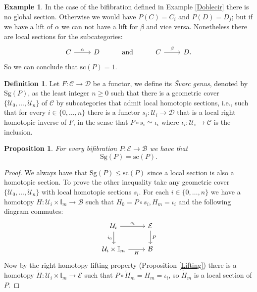 \documentclass[12pt,reqno]{amsart}
\newtheorem{prop}[teo]{Proposition}
\theoremstyle{definition}
\newtheorem{defi}[teo]{Definition}
\newtheorem{example}[teo]{Example}
\theoremstyle{remark}
\numberwithin{figure}{section}%
\newcommand{\Ba}{\mathcal{B}}
\newcommand{\CC}{\mathcal{C}}
\newcommand{\co}{\colon}
\newcommand{\Dc}{\mathcal{D}}
\newcommand{\E}{\mathcal{E}}
\newcommand{\sC}{\mathrm{sc}}
\newcommand{\sG}{\mathrm{Sg}}
\newcommand{\Uc}{\mathcal{U}}
\newcommand{\wtilde}{\widetilde}
\begin{document}
\begin{example}\label{Svar_ejemplo}
    In the case of the bifibration defined in Example \ref{Doblecir} there is no global section. Otherwise  we would have $P(C)=C_i$ and $P(D)=D_j$; but if we have a lift of $\alpha$ we can not have a lift for $\beta$ and vice versa. Nonetheless there are local sections for the subcategories:
$$
\begin{tikzcd}
C \arrow[r, "\alpha"] & D 
&\text{and}& C \arrow[r, "\beta"]  & D.
\end{tikzcd}
$$
So we can conclude that $\sC(P)=1$.
\end{example}

\begin{defi}
    Let $F\co \CC \rightarrow \Dc$ be a functor, we define its {\em \v{S}varc genus}, denoted by $\sG (P)$, as the least  integer $n\geq 0$ such that there is a geometric cover $\{\Uc_0, \ldots, \Uc_n \}$ of $\CC$ by subcategories that admit local homotopic sections, i.e., such that for every $i \in \{0, \ldots, n\} $ there is a functor $s_i \colon \Uc_i \rightarrow \Dc$ that is a local right homotopic inverse of $F$, in the sense that $P \circ s_i \simeq \iota_i$ where $\iota_i \colon \Uc_i \rightarrow \CC$ is the inclusion.
\end{defi}

\begin{prop}\label{SG=SC}
    For every bifibration $P\co\E \rightarrow \Ba$ we have that
    $$\sG(P)=\sC(P).$$
\end{prop}


\begin{proof}
    We always have that $\sG(P) \leq \sC(P)$ since a local section is also a homotopic section. To prove the other inequality take any geometric cover $\{\Uc_0, \ldots, \Uc_n \}$ with local homotopic sections $s_i$. For each $i \in \{0,\ldots,n\}$ we have a homotopy $H \colon \Uc_i \times \mathbb{I}_m \rightarrow \Ba$ such that $H_0= P\circ s_i,H_m= \iota_i$ and the following diagram commutes:
    $$
\begin{tikzcd}
\Uc_i \arrow[r, "s_i"] \arrow[d, "i_0"']  & \E \arrow[d, "P"] \\
\Uc_i \times \mathbb{I}_m \arrow[r, "H"'] & \Ba              
\end{tikzcd}
    $$
    Now by the right homotopy lifting property (Proposition \ref{Lifting}) there is a homotopy $\wtilde H  \colon \Uc_i \times \mathbb{I}_m \rightarrow \E$ such that $P \circ \wtilde H _m= H_m= \iota_i$, so $\wtilde H_m$ is a local section of $P$.
\end{proof}
\end{document}
